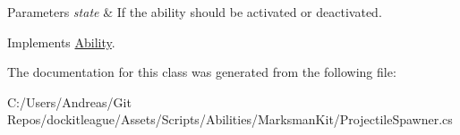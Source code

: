 \begin{DoxyParams}{Parameters}
{\em state} & If the ability should be activated or deactivated.\\
\hline
\end{DoxyParams}


Implements \hyperlink{class_ability_a10f7f3c2b63eeef6e352aee48d246384}{Ability}.



The documentation for this class was generated from the following file\+:\begin{DoxyCompactItemize}
\item 
C\+:/\+Users/\+Andreas/\+Git Repos/dockitleague/\+Assets/\+Scripts/\+Abilities/\+Marksman\+Kit/Projectile\+Spawner.\+cs\end{DoxyCompactItemize}
